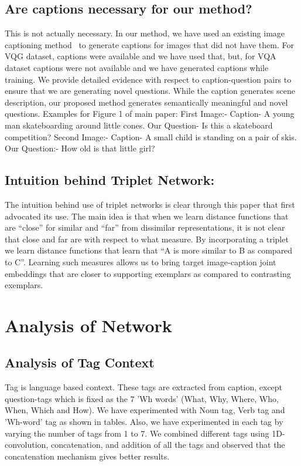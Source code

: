 \documentclass[11pt,a4paper]{article}
\begin{document}
\subsection{Are captions necessary for our method?}
 This is not actually necessary. In our method, we have used an existing image captioning method~\cite{Karpathy_CVPR2015} to generate captions for images that did not have them. For VQG dataset, captions were available and we have used that, but, for VQA dataset captions were not available and we have generated captions while training. We provide detailed evidence with respect to caption-question pairs to ensure that we are generating novel questions. While the caption generates scene description, our proposed method generates semantically meaningful and novel questions.
 Examples for Figure 1 of main paper:
First Image:- Caption- A young man skateboarding around little cones. Our Question- Is this a skateboard competition?
Second Image:- Caption- A small child is standing on a pair of skis.
Our Question:- How old is that little girl?



\subsection{Intuition behind Triplet Network:}
The intuition behind use of triplet networks is clear through this paper\cite{Frome_ICCV2007} that first advocated its use. The main idea is that when we learn distance functions that are “close” for similar and “far” from dissimilar representations, it is not clear that close and far are with respect to what measure. By incorporating a triplet we learn distance functions that learn that  “A is more similar to B as compared to C”. Learning such measures allows us to bring target image-caption joint embeddings that are closer to supporting exemplars as compared to contrasting exemplars.




\section{Analysis of Network}
\subsection{Analysis of Tag Context}
\label{sec:context_analysis_tag}

Tag is language based context. These tags are extracted from caption, except question-tags which is fixed as the 7 'Wh words' (What, Why, Where, Who, When, Which and How). We have experimented with Noun tag, Verb tag and 'Wh-word' tag as shown in tables. Also, we have experimented in each tag by varying the number of tags from 1 to 7. We combined different tags using 1D-convolution, concatenation, and addition of all the tags and observed that the concatenation mechanism  gives better results.  
\end{document}
